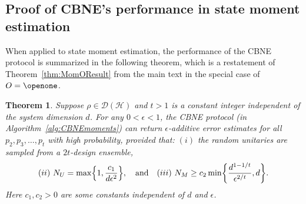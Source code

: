 \documentclass[aps,prl,twocolumn,nofootinbib,superscriptaddress,10pt]{revtex4-2}
\let\originalleft\left
\let\originalright\right
\renewcommand{\left}{\mathopen{}\mathclose\bgroup\originalleft}
\renewcommand{\right}{\aftergroup\egroup\originalright}
\theoremstyle{plain}
\newtheorem{theorem}[thm]{Theorem}
\theoremstyle{definition}
\newcommand{\caH}{\mathcal{H}}
\newcommand{\caD}{\mathcal{D}}
\newcommand{\tref}[1]{Theorem~\ref{#1}}
\begin{document}
\subsection{Proof of CBNE's performance in state moment estimation}\label{sec:performCBNEmoment}

When applied to state moment estimation, 
the performance of the CBNE protocol is summarized in the following theorem, which is a restatement of \tref{thm:MomOResult} from the main text in the special case of $O=\openone$. 

\begin{theorem}\label{thm:MomResult}
Suppose $\rho\in\caD(\caH)$ and $t>1$ is a constant integer independent of the system dimension $d$.
For any $0<\epsilon<1$, the CBNE protocol (in Algorithm~\ref{alg:CBNEmoments}) can return $\epsilon$-additive error estimates for all 
$p_2,p_3,\dots,p_t$ with high probability, provided that:
$(i)$ the random unitaries are sampled from a $2t$-design ensemble, 
\begin{align}
(ii)\ N_U= \max\left\lbrace 1, \dfrac{c_1}{d\epsilon^2} \right\rbrace  
,\quad\text{and}\quad 
(iii)\ N_M\geq  c_2  \min\left\lbrace \frac{d^{1-1/t}}{\epsilon^{2/t}}, d \right\rbrace. 
\end{align}
Here $c_1,c_2>0$ are some constants independent of $d$ and $\epsilon$. 
\end{theorem}
\end{document}
